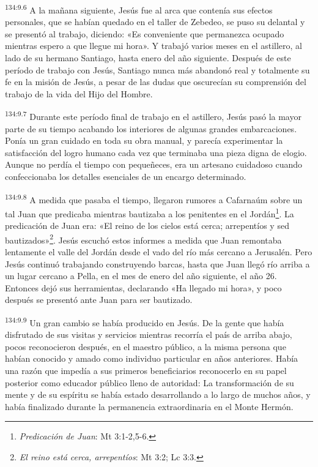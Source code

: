 \par 
\textsuperscript{134:9.6} A la mañana siguiente, Jesús fue al arca que contenía sus efectos personales, que se habían quedado en el taller de Zebedeo, se puso su delantal y se presentó al trabajo, diciendo: «Es conveniente que permanezca ocupado mientras espero a que llegue mi hora». Y trabajó varios meses en el astillero, al lado de su hermano Santiago, hasta enero del año siguiente. Después de este período de trabajo con Jesús, Santiago nunca más abandonó real y totalmente su fe en la misión de Jesús, a pesar de las dudas que oscurecían su comprensión del trabajo de la vida del Hijo del Hombre.

\par 
\textsuperscript{134:9.7} Durante este período final de trabajo en el astillero, Jesús pasó la mayor parte de su tiempo acabando los interiores de algunas grandes embarcaciones. Ponía un gran cuidado en toda su obra manual, y parecía experimentar la satisfacción del logro humano cada vez que terminaba una pieza digna de elogio. Aunque no perdía el tiempo con pequeñeces, era un artesano cuidadoso cuando confeccionaba los detalles esenciales de un encargo determinado.

\par 
\textsuperscript{134:9.8} A medida que pasaba el tiempo, llegaron rumores a Cafarnaúm sobre un tal Juan que predicaba mientras bautizaba a los penitentes en el Jordán\footnote{\textit{Predicación de Juan}: Mt 3:1-2,5-6.}. La predicación de Juan era: «El reino de los cielos está cerca; arrepentíos y sed bautizados»\footnote{\textit{El reino está cerca, arrepentíos}: Mt 3:2; Lc 3:3.}. Jesús escuchó estos informes a medida que Juan remontaba lentamente el valle del Jordán desde el vado del río más cercano a Jerusalén. Pero Jesús continuó trabajando construyendo barcas, hasta que Juan llegó río arriba a un lugar cercano a Pella, en el mes de enero del año siguiente, el año 26. Entonces dejó sus herramientas, declarando «Ha llegado mi hora», y poco después se presentó ante Juan para ser bautizado.

\par 
\textsuperscript{134:9.9} Un gran cambio se había producido en Jesús. De la gente que había disfrutado de sus visitas y servicios mientras recorría el país de arriba abajo, pocos reconocieron después, en el maestro público, a la misma persona que habían conocido y amado como individuo particular en años anteriores. Había una razón que impedía a sus primeros beneficiarios reconocerlo en su papel posterior como educador público lleno de autoridad: La transformación de su mente y de su espíritu se había estado desarrollando a lo largo de muchos años, y había finalizado durante la permanencia extraordinaria en el Monte Hermón.